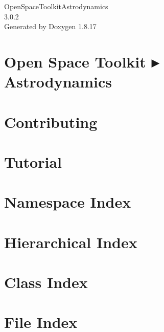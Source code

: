 \let\mypdfximage\pdfximage\def\pdfximage{\immediate\mypdfximage}\documentclass[twoside]{book}
\newcommand{\+}{\discretionary{\mbox{\scriptsize$\hookleftarrow$}}{}{}}
\newcommand{\clearemptydoublepage}{%
  \newpage{\pagestyle{empty}\cleardoublepage}%
}
\begin{document}
\hypersetup{pageanchor=false,
             bookmarksnumbered=true,
             pdfencoding=unicode
            }
\begin{titlepage}
\vspace*{7cm}
\begin{center}%
{\Large Open\+Space\+Toolkit\+Astrodynamics \\[1ex]\large 3.\+0.\+2 }\\
\vspace*{1cm}
{\large Generated by Doxygen 1.8.17}\\
\end{center}
\end{titlepage}
\clearemptydoublepage
{}
\tableofcontents
\clearemptydoublepage
{}
\hypersetup{pageanchor=true}

\chapter{Open Space Toolkit ▸ Astrodynamics}
\label{index}\hypertarget{index}{}
\chapter{Contributing}
\label{md__c_o_n_t_r_i_b_u_t_i_n_g}

\chapter{Tutorial}
\label{md_docs__tutorial}

\chapter{Namespace Index}

\chapter{Hierarchical Index}

\chapter{Class Index}

\chapter{File Index}

\end{document}
